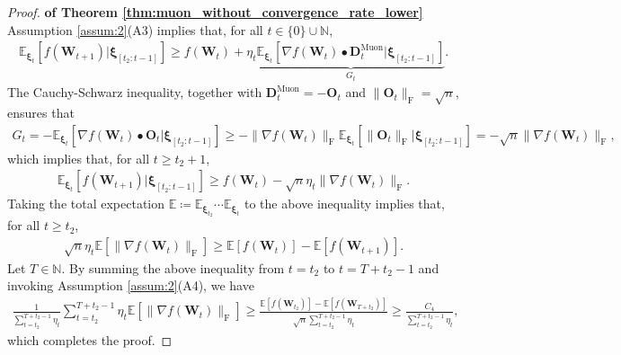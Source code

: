 \documentclass[twoside,11pt]{article}
\begin{document}
\begin{proof}
\textbf{of Theorem \ref{thm:muon_without_convergence_rate_lower}} Assumption \ref{assum:2}(A3) implies that, for all $t \in \{0\} \cup \mathbb{N}$,
\begin{align*}
\mathbb{E}_{\bm{\xi}_t} \left[ f(\bm{W}_{t+1})|\bm{\xi}_{[t_2: t-1]} \right]
\geq 
f(\bm{W}_t) 
+ \eta_t 
\underbrace{\mathbb{E}_{\bm{\xi}_t} \left[ \nabla f (\bm{W}_t) \bullet \bm{D}_t^{\mathrm{Muon}} |\bm{\xi}_{[t_2 : t-1]} \right]}_{G_t}.
\end{align*}
The Cauchy-Schwarz inequality, together with $\bm{D}_t^{\mathrm{Muon}} = - \bm{O}_t$ and $\| \bm{O}_t \|_{\mathrm{F}} = \sqrt{n}$, ensures that
\begin{align*}
G_t 
= - \mathbb{E}_{\bm{\xi}_t} \left[ \nabla f (\bm{W}_t) \bullet \bm{O}_t |\bm{\xi}_{[t_2 : t-1]} \right]
\geq  
- \| \nabla f (\bm{W}_t) \|_{\mathrm{F}} \mathbb{E}_{\bm{\xi}_t} \left[ \| \bm{O}_t \|_{\mathrm{F}} |\bm{\xi}_{[t_2 : t-1]} \right]
= - \sqrt{n} \|\nabla f (\bm{W}_t)\|_{\mathrm{F}}, 
\end{align*} 
which implies that, for all $t \geq t_2 + 1$, 
\begin{align*}
\mathbb{E}_{\bm{\xi}_t} \left[ f(\bm{W}_{t+1})|\bm{\xi}_{[t_2 : t-1]} \right]
\geq 
f(\bm{W}_t) 
- \sqrt{n} \eta_t \|\nabla f (\bm{W}_t)\|_{\mathrm{F}}.
\end{align*}
Taking the total expectation $\mathbb{E} \coloneqq \mathbb{E}_{\bm{\xi}_{t_2}} \cdots \mathbb{E}_{\bm{\xi}_{t}}$ to the above inequality implies that, for all $t \geq t_2$,
\begin{align*}
\sqrt{n} \eta_t \mathbb{E}[\|\nabla f (\bm{W}_t)\|_{\mathrm{F}}]
\geq 
\mathbb{E}[f(\bm{W}_t)] - \mathbb{E}[f(\bm{W}_{t+1})].
\end{align*}
Let $T \in \mathbb{N}$. By summing the above inequality from $t = t_2$ to $t = T + t_2 -1$ and invoking Assumption \ref{assum:2}(A4), we have
\begin{align*}
\frac{1}{\sum_{t = t_2}^{T + t_2 -1} \eta_t} \sum_{t = t_2}^{T + t_2 -1} \eta_t \mathbb{E}[\|\nabla f (\bm{W}_t)\|_{\mathrm{F}}]
\geq \frac{\mathbb{E}[f(\bm{W}_{t_2})] - \mathbb{E}[f(\bm{W}_{T + t_2})]}{\sqrt{n} \sum_{t = t_2}^{T + t_2 -1} \eta_t}
\geq \frac{C_4}{\sum_{t = t_2}^{T + t_2 -1} \eta_t},
\end{align*}
which completes the proof.
\end{proof}
\end{document}
